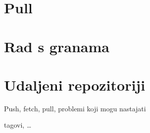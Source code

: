 \section*{Pull}

\section*{Rad s granama}

\section*{Udaljeni repozitoriji}

Push, fetch, pull, problemi koji mogu nastajati

tagovi, \dots


